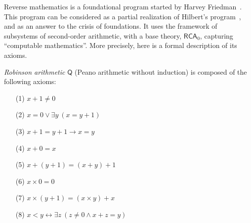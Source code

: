 \documentclass{article}
\newcommand{\Robinson}{\mathsf{Q}}
\newcommand{\RCA}{\mathsf{RCA}}
\def\qt#1{``#1''}%
\numberwithin{theorem}{section}
\theoremstyle{definition}
\begin{document}
Reverse mathematics is a foundational program started by Harvey Friedman~\cite{friedmanSystemsSecondOrder1975,friedmanSystemsSecondOrder1976}.%
This program can be considered as a partial realization of Hilbert's program~\cite{simpson1988partial}, and as an answer to the crisis of foundations. It uses the framework of subsystems of second-order arithmetic, with a base theory, $\RCA_0$, capturing \qt{computable mathematics}. More precisely, here is a formal description of its axioms.

\emph{Robinson arithmetic} $\Robinson$ (Peano arithmetic without induction) is composed of the following axioms:
\newlength \Colsep
\setlength \Colsep{10pt}

\noindent \begin{minipage}{\textwidth}
\begin{minipage}[t] [3cm] [c]{\dimexpr0.4 \textwidth-0.4 \Colsep \relax}
\begin{enumerate}
\item [(1)] $x + 1 \neq 0$
\item [(2)] $x = 0 \vee \exists y\ (x = y + 1)$
\item [(3)] $x + 1 = y + 1 \rightarrow x = y$
\item [(4)] $x + 0 = x$
\end{enumerate}
\end{minipage} \hfill
\begin{minipage}[t] [3cm] [c]{\dimexpr0.6 \textwidth-0.6 \Colsep \relax}

\begin{enumerate}
\item [(5)] $x + (y + 1) = (x+y)+1$
\item [(6)] $x \times 0 = 0$
\item [(7)] $x \times (y+1) = (x \times y) + x$
\item [(8)] $x < y \leftrightarrow \exists z\ (z \neq 0 \wedge x + z = y)$
\end{enumerate}
\end{minipage}
\end{minipage}
\end{document}
